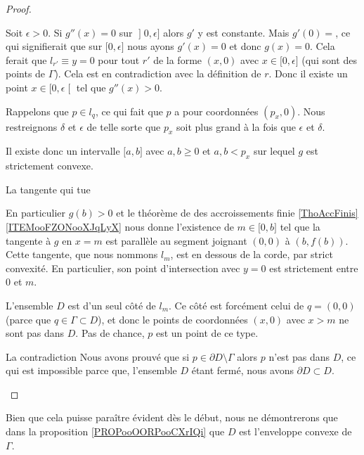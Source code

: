 \begin{proof}
\begin{subproof}
        Soit \( \epsilon>0\). Si \( g''(x)=0\) sur \( \mathopen] 0 , \epsilon \mathclose]\) alors \( g'\) y est constante. Mais \( g'(0)=\), ce qui signifierait que sur \( \mathopen[ 0 , \epsilon \mathclose]\) nous ayons \( g'(x)=0\) et donc \( g(x)=0\). Cela ferait que \( l_{r'}\equiv y=0\) pour tout \( r'\) de la forme \( (x,0)\) avec \( x\in \mathopen[ 0 , \epsilon \mathclose]\) (qui sont des points de \( \Gamma\)). Cela est en contradiction avec la définition de \( r\). Donc il existe un point \(x\in \mathopen[ 0 , \epsilon \mathclose[\) tel que \( g''(x)>0\).

        Rappelons que \( p\in l_q\), ce qui fait que \( p\) a pour coordonnées \( (p_x,0)\). Nous restreignons \( \delta\) et \( \epsilon\) de telle sorte que \( p_x\) soit plus grand à la fois que \( \epsilon\) et \(\delta\).

        Il existe donc un intervalle \( \mathopen[ a , b \mathclose]\) avec \( a,b\geq 0\) et \( a,b<p_x\) sur lequel \( g\) est strictement convexe. 
        
    \item[La tangente qui tue]

        En particulier \( g(b)>0\) et le théorème de des accroissements finie \ref{ThoAccFinis}\ref{ITEMooFZONooXJqLyX} nous donne l'existence de \( m\in\mathopen[ 0 , b \mathclose]\) tel que la tangente à \( g\) en \( x=m\) est parallèle au segment joignant \( (0,0)\) à \( (b,f(b))\). Cette tangente, que nous nommons \( l_m\), est en dessous de la corde, par strict convexité. En particulier, son point d'intersection avec \( y=0\) est strictement entre \( 0\) et \( m\).

        L'ensemble \( D\) est d'un seul côté de \(l_m\). Ce côté est forcément celui de \( q=(0,0)\) (parce que \( q\in \Gamma\subset D\)), et donc le points de coordonnées \( (x,0)\) avec \( x>m\) ne sont pas dans \(D\). Pas de chance, \( p\) est un point de ce type.

    \item[La contradiction]
        Nous avons prouvé que si \( p\in \partial D\setminus \Gamma\) alors \( p\) n'est pas dans \( D\), ce qui est impossible parce que, l'ensemble \( D\) étant fermé, nous avons \( \partial D\subset D\).
    \end{subproof}
\end{proof}

\begin{remark}
   Bien que cela puisse paraître évident dès le début, nous ne démontrerons que dans la proposition \ref{PROPooOORPooCXrIQi} que \( D\) est l'enveloppe convexe de \( \Gamma\).
\end{remark}

